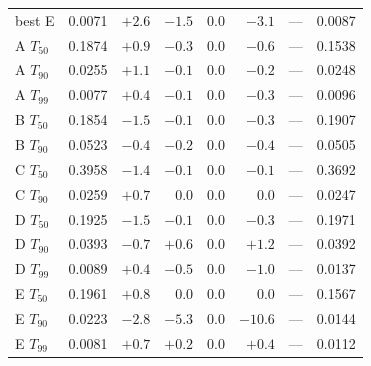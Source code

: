 \begin{tabular}{lrrrrrrr}
best E & 0.0071 & $+2.6$ & $-1.5$ & $0.0$ & $-3.1$ & --- & 0.0087\\
A $T_{50}$ & 0.1874 & $+0.9$ & $-0.3$ & $0.0$ & $-0.6$ & --- & 0.1538\\
A $T_{90}$ & 0.0255 & $+1.1$ & $-0.1$ & $0.0$ & $-0.2$ & --- & 0.0248\\
A $T_{99}$ & 0.0077 & $+0.4$ & $-0.1$ & $0.0$ & $-0.3$ & --- & 0.0096\\
B $T_{50}$ & 0.1854 & $-1.5$ & $-0.1$ & $0.0$ & $-0.3$ & --- & 0.1907\\
B $T_{90}$ & 0.0523 & $-0.4$ & $-0.2$ & $0.0$ & $-0.4$ & --- & 0.0505\\
C $T_{50}$ & 0.3958 & $-1.4$ & $-0.1$ & $0.0$ & $-0.1$ & --- & 0.3692\\
C $T_{90}$ & 0.0259 & $+0.7$ & $0.0$ & $0.0$ & $0.0$ & --- & 0.0247\\
D $T_{50}$ & 0.1925 & $-1.5$ & $-0.1$ & $0.0$ & $-0.3$ & --- & 0.1971\\
D $T_{90}$ & 0.0393 & $-0.7$ & $+0.6$ & $0.0$ & $+1.2$ & --- & 0.0392\\
D $T_{99}$ & 0.0089 & $+0.4$ & $-0.5$ & $0.0$ & $-1.0$ & --- & 0.0137\\
E $T_{50}$ & 0.1961 & $+0.8$ & $0.0$ & $0.0$ & $0.0$ & --- & 0.1567\\
E $T_{90}$ & 0.0223 & $-2.8$ & $-5.3$ & $0.0$ & $-10.6$ & --- & 0.0144\\
E $T_{99}$ & 0.0081 & $+0.7$ & $+0.2$ & $0.0$ & $+0.4$ & --- & 0.0112\\
\bottomrule\end{tabular}
